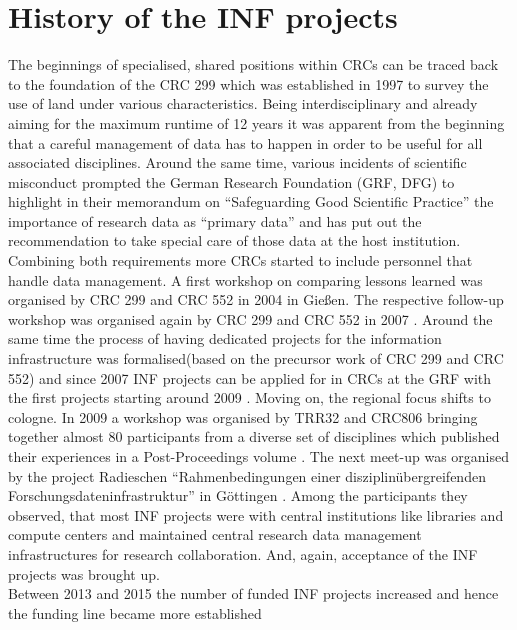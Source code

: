 \documentclass{eceasst}
\begin{document}
\section{History of the INF projects}
The beginnings of specialised, shared positions within CRCs can be traced back to the foundation of the CRC 299 which was established in 1997 to survey the use of land under various characteristics. Being interdisciplinary and already aiming for the maximum runtime of 12 years it was apparent from the beginning \cite{mueckschel2006} that a careful
management of data has to happen in order to be useful for all associated disciplines.
Around the same time, various incidents of scientific misconduct prompted the German Research Foundation (GRF, DFG) to highlight in their
memorandum on ``Safeguarding Good Scientific Practice'' \cite{DFG1998}
the importance of research data as ``primary data''  and has put out the recommendation to take special care
of those data at the host institution.
Combining both requirements more CRCs started to include personnel that handle data management.
A first workshop \cite{SFB299-2004, SFB299-2005} on comparing lessons learned was organised by CRC 299 and CRC 552 in 2004 in Gießen.
The respective follow-up workshop was organised again by CRC 299 and CRC 552 in 2007 \cite{SFB299-2007}.
Around the same time the process of having dedicated projects for the information infrastructure was formalised(based on the precursor work of CRC 299 and CRC 552)
and since 2007 INF projects can be applied for in CRCs at the GRF with the first projects starting around 2009 \cite{Forschungsdateninfrastruktur2013}.
Moving on, the regional focus shifts to cologne.
In 2009 a workshop was organised by TRR32 and CRC806
bringing together almost 80 participants from a diverse set of disciplines which published their experiences in a
Post-Proceedings volume \cite{curdt787}.
The next meet-up was organised by the project Radieschen
``Rahmenbedingungen einer disziplinübergreifenden Forschungsdateninfrastruktur''
in Göttingen \cite{Forschungsdateninfrastruktur2013}. Among the participants they observed,
that most INF projects were with central institutions like libraries and compute centers and maintained central
research data management infrastructures for research collaboration. And, again, acceptance of the INF projects was brought up.\\
Between 2013 and 2015 the number of funded INF projects increased and hence the funding line became more established \cite{Engelhardt2013Forschungsdatenmanagement, bastian_2025}
\end{document}

